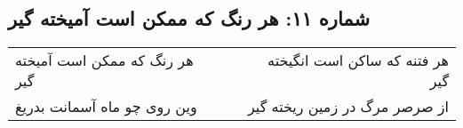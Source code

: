 \begin{center}
\section*{شماره ۱۱: هر رنگ که ممکن است آمیخته گیر}
\label{sec:011}
\begin{longtable}{l p{0.5cm} r}
هر رنگ که ممکن است آمیخته گیر
&&
هر فتنه که ساکن است انگیخته گیر
\\
وین روی چو ماه آسمانت بدریغ
&&
از صرصر مرگ در زمین ریخته گیر
\\
\end{longtable}
\end{center}
